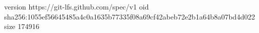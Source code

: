 version https://git-lfs.github.com/spec/v1
oid sha256:1055ef56645485a4c0a1635b77335f08a69cf42abeb72e2b1a64b8a07bd4d022
size 174916
